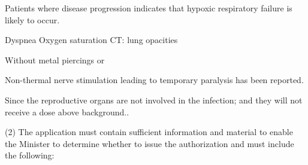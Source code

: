\documentclass[fleqn,10pt]{paper}
\begin{document}
Patients where disease progression indicates that hypoxic respiratory failure is likely to occur.

Dyspnea
Oxygen saturation
CT: lung opacities

Without metal piercings or 




Non-thermal nerve stimulation leading to temporary paralysis has been reported. 

Since the reproductive organs are not involved in the infection; and they will not receive a dose above background.\cite{Organ2004}.









(2) The application must contain sufficient information and material to enable the Minister to determine whether to issue the authorization and must include the following:
\end{document}
